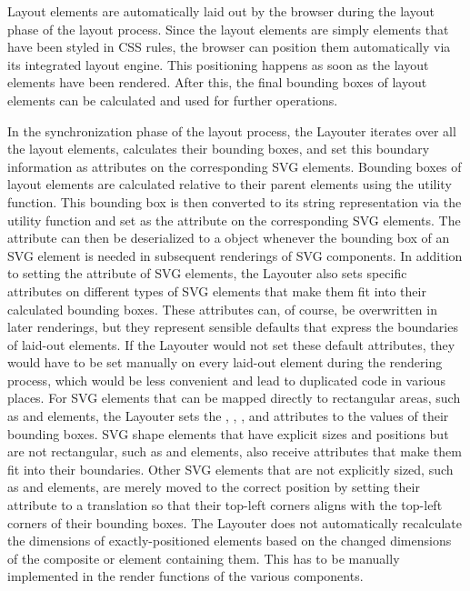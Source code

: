 Layout elements are automatically laid out by the browser during the layout phase of the layout process. 
Since the layout elements are simply  elements that have been styled in CSS rules, the browser can position them automatically via its integrated layout engine.
This positioning happens as soon as the layout elements have been rendered.
After this, the final bounding boxes of layout elements can be calculated and used for further operations.  

In the synchronization phase of the layout process, the Layouter iterates over all the layout elements, calculates their bounding boxes, and set this boundary information as attributes on the corresponding SVG elements.
Bounding boxes of layout elements are calculated relative to their parent elements using the  utility function.
This bounding box is then converted to its string representation via the  utility function and set as the  attribute on the corresponding SVG elements. 
The  attribute can then be deserialized to a  object whenever the bounding box of an SVG element is needed in subsequent renderings of SVG components. 
In addition to setting the  attribute of SVG elements, the Layouter also sets specific attributes on different types of SVG elements that make them fit into their calculated bounding boxes.
These attributes can, of course, be overwritten in later renderings, but they represent sensible defaults that express the boundaries of laid-out elements.
If the Layouter would not set these default attributes, they would have to be set manually on every laid-out element during the rendering process, which would be less convenient and lead to duplicated code in various places.
For SVG elements that can be mapped directly to rectangular areas, such as  and  elements, the Layouter sets the , , , and  attributes to the values of their bounding boxes.
SVG shape elements that have explicit sizes and positions but are not rectangular, such as  and  elements, also receive attributes that make them fit into their boundaries. 
Other SVG elements that are not explicitly sized, such as  and  elements, are merely moved to the correct position by setting their  attribute to a translation so that their top-left corners aligns with the top-left corners of their bounding boxes. 
The Layouter does not automatically recalculate the dimensions of exactly-positioned elements based on the changed dimensions of the composite  or  element containing them.
This has to be manually implemented in the render functions of the various components.

